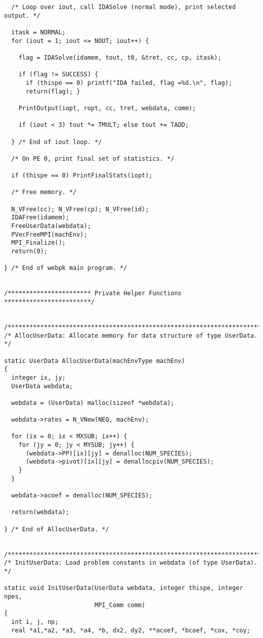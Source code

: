 \begin{verbatim}
  /* Loop over iout, call IDASolve (normal mode), print selected output. */

  itask = NORMAL;
  for (iout = 1; iout <= NOUT; iout++) {

    flag = IDASolve(idamem, tout, t0, &tret, cc, cp, itask);

    if (flag != SUCCESS) { 
      if (thispe == 0) printf("IDA failed, flag =%d.\n", flag); 
      return(flag); }

    PrintOutput(iopt, ropt, cc, tret, webdata, comm);

    if (iout < 3) tout *= TMULT; else tout += TADD;

  } /* End of iout loop. */

  /* On PE 0, print final set of statistics. */

  if (thispe == 0) PrintFinalStats(iopt);

  /* Free memory. */

  N_VFree(cc); N_VFree(cp); N_VFree(id);
  IDAFree(idamem);
  FreeUserData(webdata);
  PVecFreeMPI(machEnv);
  MPI_Finalize();
  return(0);

} /* End of webpk main program. */


/*********************** Private Helper Functions ************************/


/*************************************************************************/
/* AllocUserData: Allocate memory for data structure of type UserData.   */

static UserData AllocUserData(machEnvType machEnv)
{
  integer ix, jy;
  UserData webdata;

  webdata = (UserData) malloc(sizeof *webdata);

  webdata->rates = N_VNew(NEQ, machEnv);

  for (ix = 0; ix < MXSUB; ix++) {
    for (jy = 0; jy < MYSUB; jy++) {
      (webdata->PP)[ix][jy] = denalloc(NUM_SPECIES);
      (webdata->pivot)[ix][jy] = denallocpiv(NUM_SPECIES);
    }
  }

  webdata->acoef = denalloc(NUM_SPECIES);
 
  return(webdata);

} /* End of AllocUserData. */


/*************************************************************************/
/* InitUserData: Load problem constants in webdata (of type UserData).   */

static void InitUserData(UserData webdata, integer thispe, integer npes, 
                         MPI_Comm comm)
{
  int i, j, np;
  real *a1,*a2, *a3, *a4, *b, dx2, dy2, **acoef, *bcoef, *cox, *coy;


\end{verbatim}
